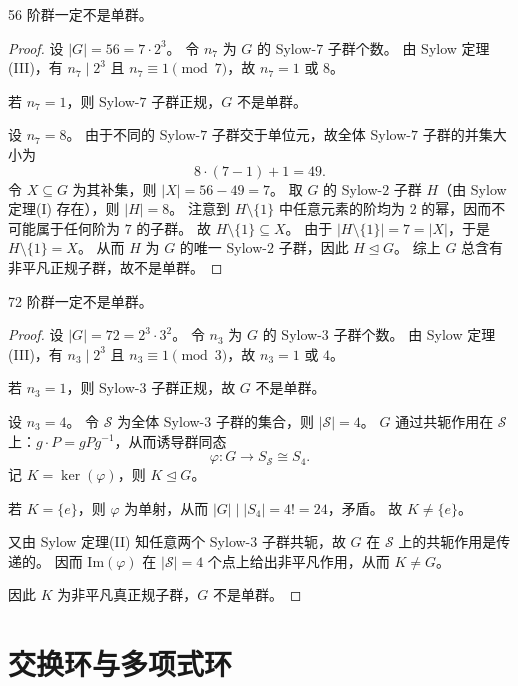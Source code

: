 \documentclass[lang=cn,a4paper,newtx]{elegantbook}
\begin{document}
\begin{proposition}
  56 阶群一定不是单群。
\end{proposition}

\begin{proof}
  设 $|G|=56=7\cdot 2^3$。
  令 $n_7$ 为 $G$ 的 Sylow-$7$ 子群个数。
  由 Sylow 定理(III)，有 $n_7\mid 2^3$ 且 $n_7\equiv 1\pmod 7$，故 $n_7=1$ 或 $8$。

  若 $n_7=1$，则 Sylow-$7$ 子群正规，$G$ 不是单群。

  设 $n_7=8$。
  由于不同的 Sylow-$7$ 子群交于单位元，故全体 Sylow-$7$ 子群的并集大小为
  \[
    8\cdot (7-1)+1=49.
  \]
  令 $X\subseteq G$ 为其补集，则 $|X|=56-49=7$。
  取 $G$ 的 Sylow-$2$ 子群 $H$（由 Sylow 定理(I) 存在），则 $|H|=8$。
  注意到 $H\setminus\{1\}$ 中任意元素的阶均为 $2$ 的幂，因而不可能属于任何阶为 $7$ 的子群。
  故 $H\setminus\{1\}\subseteq X$。
  由于 $|H\setminus\{1\}|=7=|X|$，于是 $H\setminus\{1\}=X$。
  从而 $H$ 为 $G$ 的唯一 Sylow-$2$ 子群，因此 $H\trianglelefteq G$。
  综上 $G$ 总含有非平凡正规子群，故不是单群。
\end{proof}

\begin{proposition}
  72 阶群一定不是单群。
\end{proposition}

\begin{proof}
  设 $|G|=72=2^3\cdot 3^2$。
  令 $n_3$ 为 $G$ 的 Sylow-$3$ 子群个数。
  由 Sylow 定理(III)，有 $n_3\mid 2^3$ 且 $n_3\equiv 1\pmod 3$，故 $n_3=1$ 或 $4$。

  若 $n_3=1$，则 Sylow-$3$ 子群正规，故 $G$ 不是单群。

  设 $n_3=4$。
  令 $\mathcal{S}$ 为全体 Sylow-$3$ 子群的集合，则 $|\mathcal{S}|=4$。
  $G$ 通过共轭作用在 $\mathcal{S}$ 上：$g\cdot P=gPg^{-1}$，从而诱导群同态
  \[
    \varphi:G\to S_{\mathcal{S}}\cong S_4.
  \]
  记 $K=\ker(\varphi)$，则 $K\trianglelefteq G$。

  若 $K=\{e\}$，则 $\varphi$ 为单射，从而 $|G|\mid |S_4|=4!=24$，矛盾。
  故 $K\ne \{e\}$。

  又由 Sylow 定理(II) 知任意两个 Sylow-$3$ 子群共轭，故 $G$ 在 $\mathcal{S}$ 上的共轭作用是传递的。
  因而 $\mathrm{Im}(\varphi)$ 在 $|\mathcal{S}|=4$ 个点上给出非平凡作用，从而 $K\ne G$。

  因此 $K$ 为非平凡真正规子群，$G$ 不是单群。
\end{proof}

\chapter{交换环与多项式环}
\end{document}
